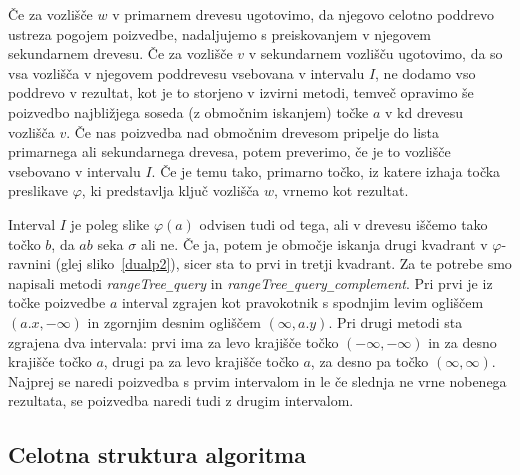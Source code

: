 \documentclass[a4paper, 12pt]{book}
\newcommand{\U}{\texttt{\_}}
\begin{document}
Če za vozlišče $w$ v primarnem drevesu ugotovimo, da njegovo celotno poddrevo ustreza pogojem poizvedbe, nadaljujemo s preiskovanjem v njegovem sekundarnem drevesu. Če za vozlišče $v$ v sekundarnem vozlišču ugotovimo, da so vsa vozlišča v njegovem poddrevesu vsebovana v intervalu $I$, ne dodamo vso poddrevo v rezultat, kot je to storjeno v izvirni metodi, temveč opravimo še poizvedbo najbližjega soseda (z območnim iskanjem) točke $a$ v kd drevesu vozlišča $v$. Če nas poizvedba nad območnim drevesom pripelje do lista primarnega ali sekundarnega drevesa, potem preverimo, če je to vozlišče vsebovano v intervalu $I$. Če je temu tako, primarno točko, iz katere izhaja točka preslikave $\varphi$, ki predstavlja ključ vozlišča $w$, vrnemo kot rezultat.

Interval $I$ je poleg slike $\varphi (a)$ odvisen tudi od tega, ali v drevesu iščemo tako točko $b$, da $ab$ seka $\sigma$ ali ne. Če ja, potem je območje iskanja drugi kvadrant v $\varphi$-ravnini (glej sliko~\ref{dualp2}), sicer sta to prvi in tretji kvadrant. Za te potrebe smo napisali metodi \textit{rangeTree\U query} in \textit{rangeTree\U query\U complement}. Pri prvi je iz točke poizvedbe $a$ interval zgrajen kot pravokotnik s spodnjim levim ogliščem $(a.x, -\infty)$ in zgornjim desnim ogliščem $(\infty, a.y)$. Pri drugi metodi sta zgrajena dva intervala: prvi ima za levo krajišče točko $(-\infty, -\infty)$ in za desno krajišče točko $a$, drugi pa za levo krajišče točko $a$, za desno pa točko $(\infty, \infty)$. Najprej se naredi poizvedba s prvim intervalom in le če slednja ne vrne nobenega rezultata, se poizvedba naredi tudi z drugim intervalom.
\subsection{Celotna struktura algoritma}
\end{document}
